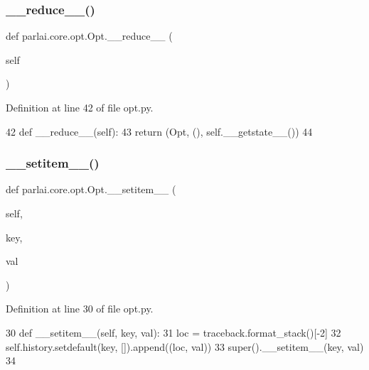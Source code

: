 \subsubsection{\texorpdfstring{\+\_\+\+\_\+reduce\+\_\+\+\_\+()}{\_\_reduce\_\_()}}
{\footnotesize\ttfamily def parlai.\+core.\+opt.\+Opt.\+\_\+\+\_\+reduce\+\_\+\+\_\+ (\begin{DoxyParamCaption}\item[{}]{self }\end{DoxyParamCaption})}



Definition at line 42 of file opt.\+py.


\begin{DoxyCode}
42     \textcolor{keyword}{def }\_\_reduce\_\_(self):
43         \textcolor{keywordflow}{return} (Opt, (), self.\_\_getstate\_\_())
44 
\end{DoxyCode}
\mbox{\label{classparlai_1_1core_1_1opt_1_1Opt_add21c2b498848bbb3a1c612bcc94ce6d}} 
\subsubsection{\texorpdfstring{\+\_\+\+\_\+setitem\+\_\+\+\_\+()}{\_\_setitem\_\_()}}
{\footnotesize\ttfamily def parlai.\+core.\+opt.\+Opt.\+\_\+\+\_\+setitem\+\_\+\+\_\+ (\begin{DoxyParamCaption}\item[{}]{self,  }\item[{}]{key,  }\item[{}]{val }\end{DoxyParamCaption})}



Definition at line 30 of file opt.\+py.


\begin{DoxyCode}
30     \textcolor{keyword}{def }\_\_setitem\_\_(self, key, val):
31         loc = traceback.format\_stack()[-2]
32         self.history.setdefault(key, []).append((loc, val))
33         super().\_\_setitem\_\_(key, val)
34 
\end{DoxyCode}
\mbox{\label{classparlai_1_1core_1_1opt_1_1Opt_ad9e71cc8859fefe46badf73335545218}} 
